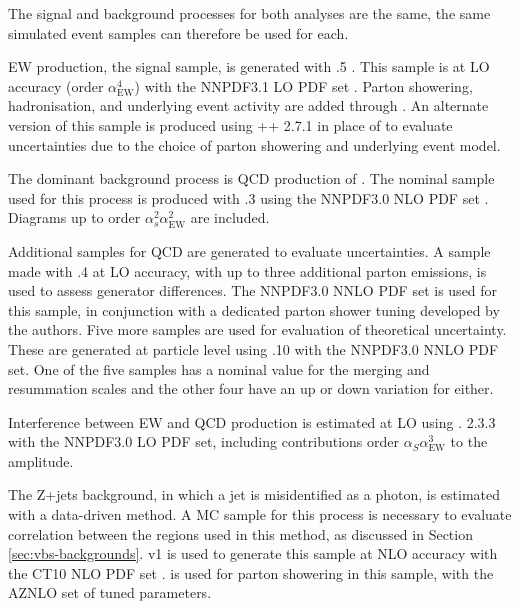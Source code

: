 

The signal and background processes for both analyses are the same, the same
simulated event samples can therefore be used for each.

\ac{EW} \Zyjj production, the signal sample, is generated with .5 \cite{madgraph5amc}.  This sample is at \ac{LO} accuracy (order
$\alpha_\text{EW}^4$) with the NNPDF3.1 \ac{LO} \ac{PDF} set \cite{NNPDF3dot1}.
Parton showering, hadronisation, and underlying event activity are added through
 \cite{pythia8dot2}. An alternate version of this sample is
produced using {\herwig}++ 2.7.1 \cite{herwigpp,herwigpp2dot7} in place of \pythia
to evaluate uncertainties due to the choice of parton showering and underlying
event model.

The dominant background process is \ac{QCD} production of \Zyjj. The nominal
sample used for this process is produced with .3
\cite{madgraph5amc} using the NNPDF3.0 \ac{NLO} \ac{PDF} set \cite{NNPDF3dot0}.
Diagrams up to order $\alpha_s^2\alpha_\text{EW}^2$ are included.

Additional samples for \ac{QCD} \Zyjj are generated to evaluate uncertainties.
A sample made with .4 \cite{sherpa2dot2} at \ac{LO} accuracy, with up
to three additional parton emissions, is used to assess generator differences.
The NNPDF3.0 \ac{NNLO} \ac{PDF} set is used for this sample, in conjunction with
a dedicated parton shower tuning developed by the \sherpa authors.
%
Five more samples are used for evaluation of theoretical uncertainty. These are
generated at particle level using .10 \cite{sherpa2dot2} with the
NNPDF3.0 \ac{NNLO} \ac{PDF} set.  One of the five samples has a nominal value
for the merging and resummation scales and the other four have an up or down
variation for either.

Interference between \ac{EW} and \ac{QCD} \Zy production is estimated at \ac{LO}
using \madgraphfiveamc. 2.3.3 with the NNPDF3.0 \ac{LO} PDF set, including
contributions order $\alpha_S\alpha_\text{EW}^3$ to the amplitude.

The Z+jets background, in which a jet is misidentified as a photon, is estimated
with a data-driven method. A \ac{MC} sample for this process is necessary to
evaluate correlation between the regions used in this method, as discussed in
Section \ref{sec:vbs-backgrounds}.
\powhegbox v1 \cite{Nason2004,powheg,powhegbox}
is used to generate this sample at \ac{NLO} accuracy with the CT10 \ac{NLO}
\ac{PDF} set \cite{ct10}.
 \cite{pythia8dot2}
is used for parton showering in this sample, with the AZNLO \cite{AZNLOtune}
set of tuned parameters.

